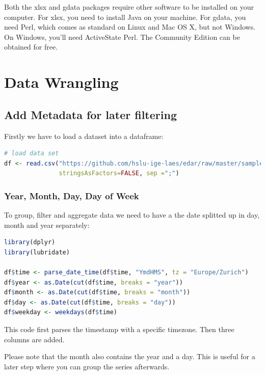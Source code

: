 \documentclass[
]{book}
\begin{document}
Both the xlsx and gdata packages require other software to be installed on your computer. For xlsx, you need to install Java on your machine. For gdata, you need Perl, which comes as standard on Linux and Mac OS X, but not Windows. On Windows, you'll need ActiveState Perl. The Community Edition can be obtained for free.

\hypertarget{data-wrangling}{%
\chapter{Data Wrangling}\label{data-wrangling}}

\hypertarget{add-metadata-for-later-filtering}{%
\section{Add Metadata for later filtering}\label{add-metadata-for-later-filtering}}

Firstly we have to load a dataset into a dataframe:

\begin{lstlisting}[language=R]
# load data set
df <- read.csv("https://github.com/hslu-ige-laes/edar/raw/master/sampleData/centralOutsideTemp.csv",
               stringsAsFactors=FALSE, sep =";")
\end{lstlisting}

\hypertarget{year-month-day-day-of-week}{%
\subsection{Year, Month, Day, Day of Week}\label{year-month-day-day-of-week}}

To group, filter and aggregate data we need to have a the date splitted up in day, month and year separately:

\begin{lstlisting}[language=R]
library(dplyr)
library(lubridate)

df$time <- parse_date_time(df$time, "YmdHMS", tz = "Europe/Zurich")
df$year <- as.Date(cut(df$time, breaks = "year"))
df$month <- as.Date(cut(df$time, breaks = "month"))
df$day <- as.Date(cut(df$time, breaks = "day"))
df$weekday <- weekdays(df$time)
\end{lstlisting}

This code first parses the timestamp with a specific timezone. Then three columns are added.

Please note that the month also contains the year and a day. This is useful for a later step where you can group the series afterwards.
\end{document}
